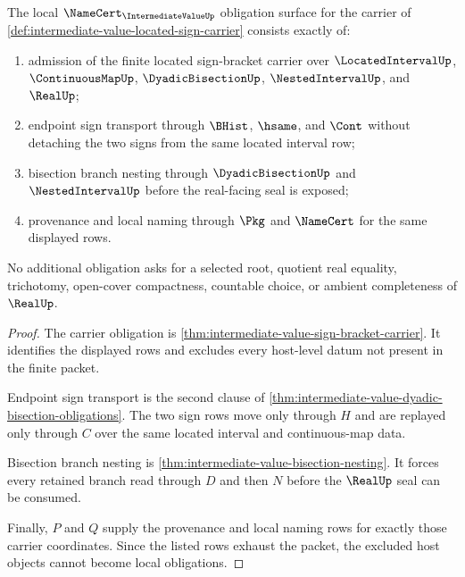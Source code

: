 \begin{theorem}
\label{thm:intermediate-value-namecert-obligations}
The local $\NameCert_{\IntermediateValueUp}$ obligation surface for the carrier of \autoref{def:intermediate-value-located-sign-carrier} consists exactly of:
\begin{enumerate}
\item admission of the finite located sign-bracket carrier over $\LocatedIntervalUp$, $\ContinuousMapUp$, $\DyadicBisectionUp$, $\NestedIntervalUp$, and $\RealUp$;
\item endpoint sign transport through $\BHist$, $\hsame$, and $\Cont$ without detaching the two signs from the same located interval row;
\item bisection branch nesting through $\DyadicBisectionUp$ and $\NestedIntervalUp$ before the real-facing seal is exposed;
\item provenance and local naming through $\Pkg$ and $\NameCert$ for the same displayed rows.
\end{enumerate}
No additional obligation asks for a selected root, quotient real equality, trichotomy, open-cover compactness, countable choice, or ambient completeness of $\RealUp$.
\end{theorem}
\begin{proof}
The carrier obligation is \autoref{thm:intermediate-value-sign-bracket-carrier}. It identifies the displayed rows and excludes every host-level datum not present in the finite packet.

Endpoint sign transport is the second clause of \autoref{thm:intermediate-value-dyadic-bisection-obligations}. The two sign rows move only through $H$ and are replayed only through $C$ over the same located interval and continuous-map data.

Bisection branch nesting is \autoref{thm:intermediate-value-bisection-nesting}. It forces every retained branch read through $D$ and then $N$ before the $\RealUp$ seal can be consumed.

Finally, $P$ and $Q$ supply the provenance and local naming rows for exactly those carrier coordinates. Since the listed rows exhaust the packet, the excluded host objects cannot become local obligations.
\end{proof}

